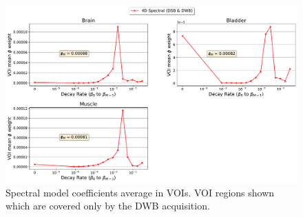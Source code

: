 \begin{figure} [h!]
\centering
\includegraphics[scale=0.48,angle=0]{3_Results/3_3_DWB_Reconstruction/figures/3_3_IsotoPK_CTRL_DWB_SpectralParams_peripheral_.pdf}
\caption{Spectral model coefficients average in VOIs. VOI regions shown which are covered only by the DWB acquisition.}
\label{fig_3_3:IsotoPK_CTRL_DSB_Spectrals}
\end{figure} 

\clearpage
